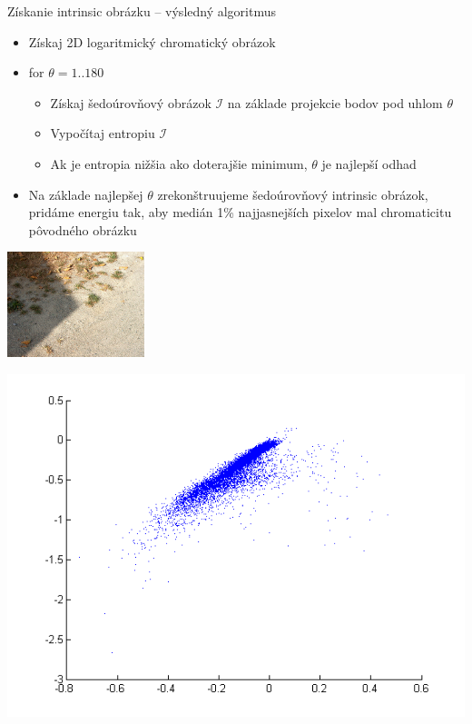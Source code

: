 \documentclass[red]{beamer}
\begin{document}

\begin{frame}{Získanie intrinsic obrázku -- výsledný algoritmus}
\begin{itemize}[<+->]
\item Získaj 2D logaritmický chromatický obrázok
\item for $\theta=1..180$
\begin{itemize}[<+->]
\item Získaj šedoúrovňový obrázok $\mathcal{I}$ na základe projekcie bodov pod uhlom $\theta$
\item Vypočítaj entropiu $\mathcal{I}$
\item Ak je entropia nižšia ako doterajšie minimum, $\theta$ je najlepší odhad
\end{itemize}
\item Na základe najlepšej $\theta$ zrekonštruujeme šedoúrovňový intrinsic obrázok, pridáme energiu tak, aby medián 1\% najjasnejších pixelov mal chromaticitu pôvodného obrázku
\end{itemize}
\end{frame}



\begin{frame}
\centerline{\includegraphics[width=.75\linewidth]{./img/example}}
\end{frame}

\begin{frame}
\centerline{\includegraphics[width=.9\linewidth]{./img/chromaticity1}}
\end{frame}
\end{document}
